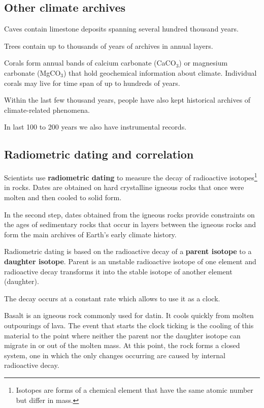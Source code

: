 \subsection{Other climate archives}
Caves contain limestone deposits spanning several hundred thousand years.

Trees contain up to thousands of years of archives in annual layers.

Corals form annual bands of calcium carbonate (CaCO$_3$) or magnesium
carbonate (MgCO$_3$) that hold geochemical information about climate.
Individual corals may live for time span of up to hundreds of years.

Within the last few thousand years, people have also kept historical archives
of climate-related phenomena.

In last 100 to 200 years we also have instrumental records.

\subsection{Radiometric dating and correlation}

Scientists use \textbf{radiometric dating} to measure the decay of radioactive
isotopes\footnote{
	Isotopes are forms of a chemical element that have the same atomic
	number but differ in mass.
} in rocks. Dates are obtained on hard crystalline igneous rocks that once
were molten and then cooled to solid form.

In the second step, dates obtained from the igneous rocks provide constraints
on the ages of sedimentary rocks that occur in layers between the igneous rocks
and form the main archives of Earth's early climate history.

Radiometric dating is based on the radioactive decay of a \textbf{parent
isotope} to a \textbf{daughter isotope}. Parent is an unstable radioactive
isotope of one element and radioactive decay transforms it into the stable
isotope of another element (daughter).

The decay occurs at a constant rate which allows to use it as a clock.

Basalt is an igneous rock commonly used for datin. It cools quickly from molten
outpourings of lava. The event that starts the clock ticking is the cooling of
this material to the point where neither the parent nor the daughter isotope
can migrate in or out of the molten mass. At this point, the rock forms a
closed system, one in which the only changes occurring are caused by internal
radioactive decay.

